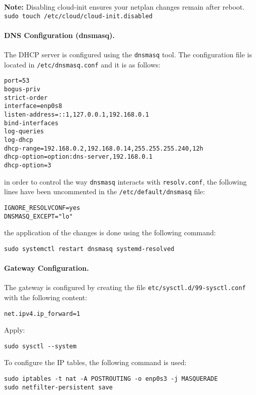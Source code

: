 \textbf{Note:} Disabling cloud-init ensures your netplan changes remain after reboot. \texttt{sudo touch /etc/cloud/cloud-init.disabled}

\paragraph{DNS Configuration (dnsmasq).}

The DHCP server is configured using the \texttt{dnsmasq} tool. The configuration file is located in \texttt{/etc/dnsmasq.conf} and it is as follows:

\begin{verbatim}
port=53
bogus-priv
strict-order
interface=enp0s8
listen-address=::1,127.0.0.1,192.168.0.1
bind-interfaces
log-queries
log-dhcp
dhcp-range=192.168.0.2,192.168.0.14,255.255.255.240,12h
dhcp-option=option:dns-server,192.168.0.1
dhcp-option=3
\end{verbatim}

in order to control the way \texttt{dnsmasq} interacts with \texttt{resolv.conf}, the following lines have been uncommented in the \texttt{/etc/default/dnsmasq} file:
\begin{verbatim}
IGNORE_RESOLVCONF=yes
DNSMASQ_EXCEPT="lo"
\end{verbatim}
the application of the changes is done using the following command:
\begin{verbatim}
sudo systemctl restart dnsmasq systemd-resolved
\end{verbatim}

\paragraph{Gateway Configuration.}


The gateway is configured by creating the file \texttt{etc/sysctl.d/99-sysctl.conf} with the following content:

\begin{verbatim}
net.ipv4.ip_forward=1
\end{verbatim}
Apply:
\begin{verbatim}
sudo sysctl --system
\end{verbatim}
To configure the IP tables, the following command is used:
\begin{verbatim}
sudo iptables -t nat -A POSTROUTING -o enp0s3 -j MASQUERADE
sudo netfilter-persistent save
\end{verbatim}


